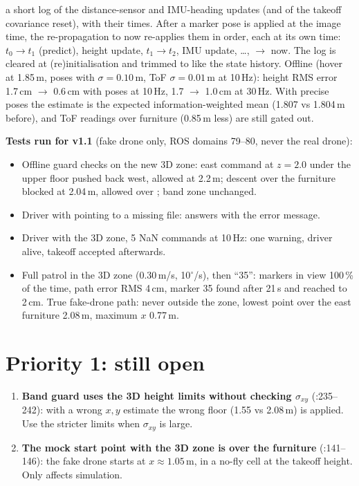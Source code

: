 \begin{enumerate}[leftmargin=*]
  a short log  of the distance-sensor and IMU-heading updates (and of the takeoff covariance reset),
  with their times. After a marker pose is applied at the image time, the re-propagation to now re-applies them in
  order, each at its own time: $t_0 \to t_1$ (predict), height update, $t_1\to t_2$, IMU update, \dots, $\to$ now.
  The log is cleared at (re)initialisation and trimmed to  like the state history.
  Offline (hover at 1.85\,m, poses with $\sigma = 0.10$\,m, ToF $\sigma = 0.01$\,m at 10\,Hz): height RMS error
  1.7\,cm $\to$ 0.6\,cm with poses at 10\,Hz, 1.7 $\to$ 1.0\,cm at 30\,Hz. With precise poses the estimate is
  the expected information-weighted mean (1.807 vs 1.804\,m before), and ToF readings over furniture (0.85\,m
  less) are still gated out.
\end{enumerate}

\textbf{Tests run for v1.1} (fake drone only, ROS domains 79--80, never the real drone):
\begin{itemize}[leftmargin=*]
\item Offline guard checks on the new 3D zone: east command at $z=2.0$ under the upper floor pushed back west, allowed
  at 2.2\,m; descent over the furniture blocked at 2.04\,m, allowed over ; band zone unchanged.
\item Driver with  pointing to a missing file:  answers
   with the error message.
\item Driver with the 3D zone, 5 NaN commands at 10\,Hz: one warning, driver alive, takeoff accepted afterwards.
\item Full patrol in the 3D zone (0.30\,m/s, 10$^\circ$/s), then ``35'': markers in view 100\,\% of the time, path
  error RMS 4\,cm, marker 35 found after 21\,s and reached to 2\,cm. True fake-drone path: never outside the zone,
  lowest point over the east furniture 2.08\,m, maximum $x$ 0.77\,m.
\end{itemize}

\section{Priority 1: still open}

\begin{enumerate}[leftmargin=*]
\item \textbf{Band guard uses the 3D height limits without checking $\sigma_{xy}$} (:235--242):
  with a wrong $x,y$ estimate the wrong floor (1.55 vs 2.08\,m) is applied. Use the stricter limits when
  $\sigma_{xy}$ is large.
\item \textbf{The mock start point with the 3D zone is over the furniture} (:141--146): the fake
  drone starts at $x\approx 1.05$\,m, in a no-fly cell at the takeoff height. Only affects simulation.
\end{enumerate}

